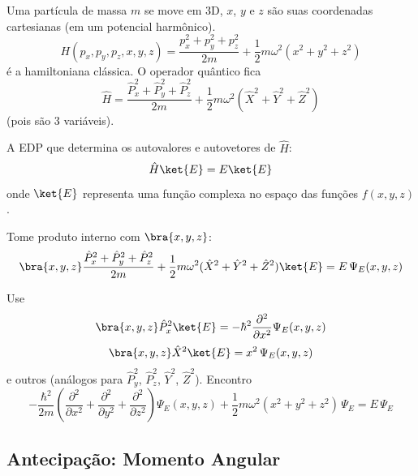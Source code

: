 Uma partícula de massa $m$ se move em 3D, $x$, $y$ e $z$ são suas coordenadas cartesianas (em um potencial harmônico).
\begin{equation}
    H(p_x, p_y, p_z, x, y, z) = \frac{p_x^2 + p_y^2 + p_z^2}{2m} + \frac{1}{2}m\omega^2(x^2+y^2+z^2)
\label{eq:aula13_H_classica_3D}
\end{equation}
é a hamiltoniana clássica. O operador quântico fica
\begin{equation}
    \hat{H} = \frac{\hat{P}_x^2 + \hat{P}_y^2 + \hat{P}_z^2}{2m} + \frac{1}{2}m\omega^2(\hat{X}^2+\hat{Y}^2+\hat{Z}^2)
\label{eq:aula13_H_quantica_3D}
\end{equation}
(pois são 3 variáveis).

A EDP que determina os autovalores e autovetores de $\hat{H}$:
\begin{equation}
    \hat{H}\ket{E} = E\ket{E}
\label{eq:aula13_autovalor_H}
\end{equation}
onde $\ket{E}$ representa uma função complexa no espaço das funções $f(x,y,z)$.

Tome produto interno com $\bra{x,y,z}$:
\begin{equation}
    \bra{x,y,z} \frac{\hat{P}_x^2+\hat{P}_y^2+\hat{P}_z^2}{2m} + \frac{1}{2}m\omega^2(\hat{X}^2+\hat{Y}^2+\hat{Z}^2) \ket{E} = E\,\Psi_E(x,y,z)
\label{eq:aula13_proj_xyz}
\end{equation}

Use
\begin{equation}
    \bra{x,y,z}\hat{P}_x^2\ket{E} = -\hbar^2 \frac{\partial^2}{\partial x^2}\Psi_E(x,y,z)
\label{eq:aula13_Px2_acao}
\end{equation}
\begin{equation}
    \bra{x,y,z}\hat{X}^2\ket{E} = x^2\,\Psi_E(x,y,z)
\label{eq:aula13_X2_acao}
\end{equation}
e outros (análogos para $\hat{P}_y^2$, $\hat{P}_z^2$, $\hat{Y}^2$, $\hat{Z}^2$). Encontro
\begin{equation}
    -\frac{\hbar^2}{2m}\left(\frac{\partial^2}{\partial x^2} + \frac{\partial^2}{\partial y^2} + \frac{\partial^2}{\partial z^2}\right)\Psi_E(x,y,z) + \frac{1}{2}m\omega^2(x^2+y^2+z^2)\,\Psi_E = E\,\Psi_E
\label{eq:aula13_EDP_3D_final}
\end{equation}

\subsection*{Antecipação: Momento Angular}

